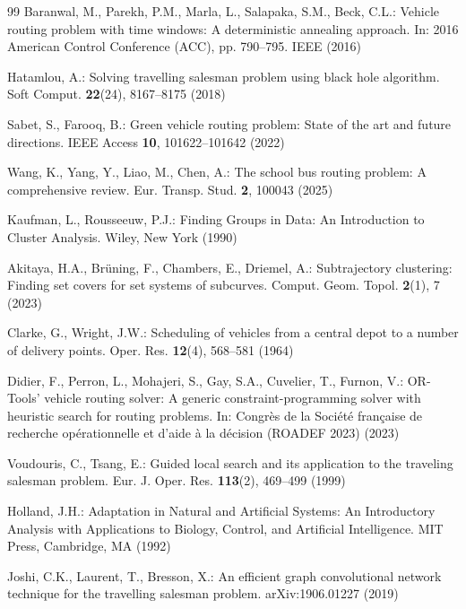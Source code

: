 {\begin{thebibliography}{99}
Baranwal, M., Parekh, P.M., Marla, L., Salapaka, S.M., Beck, C.L.: Vehicle routing problem with time windows: A deterministic annealing approach. In: 2016 American Control Conference (ACC), pp. 790--795. IEEE (2016)

Hatamlou, A.: Solving travelling salesman problem using black hole algorithm. Soft Comput. \textbf{22}(24), 8167--8175 (2018)

Sabet, S., Farooq, B.: Green vehicle routing problem: State of the art and future directions. IEEE Access \textbf{10}, 101622--101642 (2022)

Wang, K., Yang, Y., Liao, M., Chen, A.: The school bus routing problem: A comprehensive review. Eur. Transp. Stud. \textbf{2}, 100043 (2025)

Kaufman, L., Rousseeuw, P.J.: Finding Groups in Data: An Introduction to Cluster Analysis. Wiley, New York (1990)

Akitaya, H.A., Brüning, F., Chambers, E., Driemel, A.: Subtrajectory clustering: Finding set covers for set systems of subcurves. Comput. Geom. Topol. \textbf{2}(1), 7 (2023)

Clarke, G., Wright, J.W.: Scheduling of vehicles from a central depot to a number of delivery points. Oper. Res. \textbf{12}(4), 568--581 (1964)

Didier, F., Perron, L., Mohajeri, S., Gay, S.A., Cuvelier, T., Furnon, V.: OR-Tools' vehicle routing solver: A generic constraint-programming solver with heuristic search for routing problems. In: Congrès de la Société française de recherche opérationnelle et d'aide à la décision (ROADEF 2023) (2023)

Voudouris, C., Tsang, E.: Guided local search and its application to the traveling salesman problem. Eur. J. Oper. Res. \textbf{113}(2), 469--499 (1999)

Holland, J.H.: Adaptation in Natural and Artificial Systems: An Introductory Analysis with Applications to Biology, Control, and Artificial Intelligence. MIT Press, Cambridge, MA (1992)

Joshi, C.K., Laurent, T., Bresson, X.: An efficient graph convolutional network technique for the travelling salesman problem. arXiv:1906.01227 (2019)


\end{thebibliography}}
